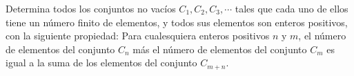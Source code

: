 \documentclass[11pt]{scrartcl}
\begin{document}
\begin{problem}
    [2021/6] 
    Determina todos los conjuntos no vacíos $C_1, C_2, C_3, \cdots $ tales que cada uno de ellos tiene un número finito de elementos, y todos sus elementos son enteros positivos, con la siguiente propiedad: Para cualesquiera enteros positivos $n$ y $m$, el número de elementos del conjunto $C_n$ más el número de elementos del conjunto $C_m$ es igual a la suma de los elementos del conjunto $C_{m + n}$.
\end{problem}
\end{document}
